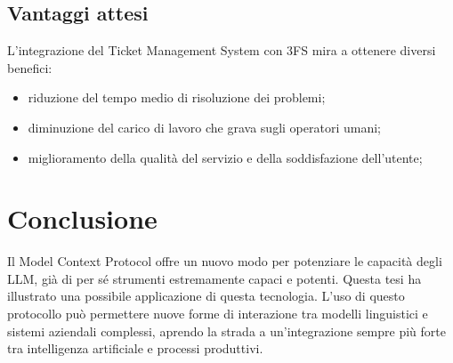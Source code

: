 \subsection{Vantaggi attesi}
L'integrazione del Ticket Management System con 3FS{\textsuperscript{\tiny\textcopyright}} mira a ottenere diversi benefici:
\begin{itemize}
    \item riduzione del tempo medio di risoluzione dei problemi;
    \item diminuzione del carico di lavoro che grava sugli operatori umani;
    \item miglioramento della qualità del servizio e della soddisfazione dell'utente;
\end{itemize}

\newpage
\section{Conclusione}
Il Model Context Protocol offre un nuovo modo per potenziare le capacità degli LLM, già di per sé strumenti estremamente capaci e potenti.
Questa tesi ha illustrato una possibile applicazione di questa tecnologia.
L'uso di questo protocollo può permettere nuove forme di interazione tra modelli linguistici e sistemi aziendali 
complessi, aprendo la strada a un'integrazione sempre più forte tra intelligenza artificiale e processi produttivi.